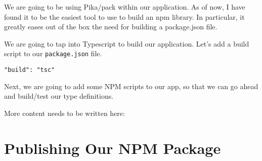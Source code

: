 We are going to be using Pika/pack within our application. As of now, I have found 
it to be the easiest tool to use to build an npm library. In particular, it greatly 
eases out of the box the need for building a package.json file. 

We are going to tap into Typescript to build our application. Let's add a build 
script to our \lstinline{package.json} file.
\begin{verbatim}
"build": "tsc"
\end{verbatim}

Next, we are going to add some NPM scripts to our app, so that we can go ahead
and build/test our type definitions. 

More content needs to be written here: 

\section{Publishing Our NPM Package}

